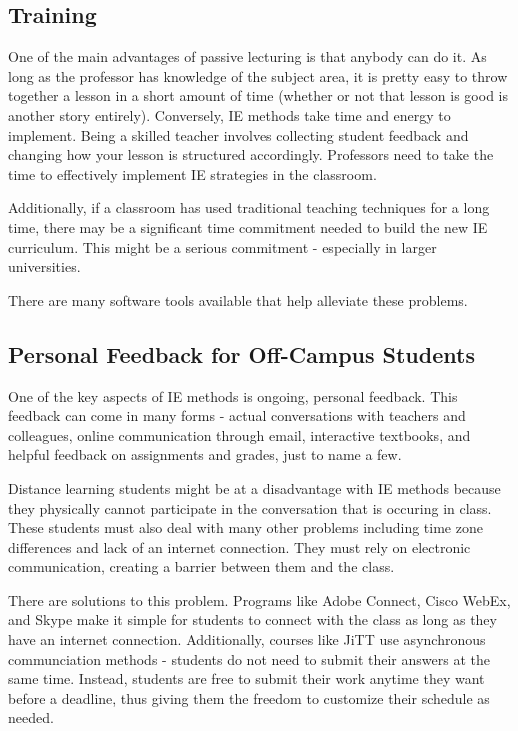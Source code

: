 \subsection{Training}

One of the main advantages of passive lecturing is that anybody can do it. As long as the professor has knowledge of the subject area, it is pretty easy to throw together a lesson in a short amount of time (whether or not that lesson is good is another story entirely). Conversely, IE methods take time and energy to implement. Being a skilled teacher involves collecting student feedback and changing how your lesson is structured accordingly. Professors need to take the time to effectively implement IE strategies in the classroom.

Additionally, if a classroom has used traditional teaching techniques for a long time, there may be a significant time commitment needed to build the new IE curriculum. This might be a serious commitment - especially in larger universities.

There are many software tools available that help alleviate these problems.

\subsection{Personal Feedback for Off-Campus Students}

One of the key aspects of IE methods is ongoing, personal feedback. This feedback can come in many forms - actual conversations with teachers and colleagues, online communication through email, interactive textbooks, and helpful feedback on assignments and grades, just to name a few.

Distance learning students might be at a disadvantage with IE methods because they physically cannot participate in the conversation that is occuring in class. These students must also deal with many other problems including time zone differences and lack of an internet connection. They must rely on electronic communication, creating a barrier between them and the class.

There are solutions to this problem. Programs like Adobe Connect, Cisco WebEx, and Skype make it simple for students to connect with the class as long as they have an internet connection. Additionally, courses like JiTT use asynchronous communciation methods - students do not need to submit their answers at the same time. Instead, students are free to submit their work anytime they want before a deadline, thus giving them the freedom to customize their schedule as needed.


